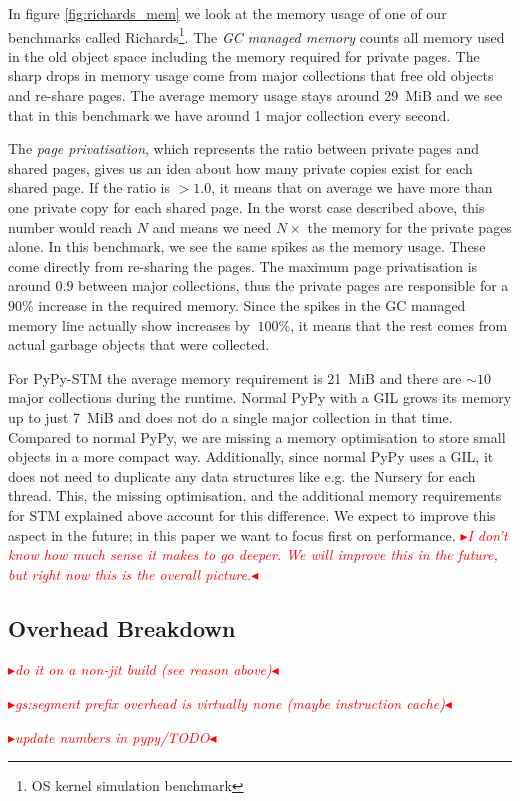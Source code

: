 \documentclass{sigplanconf}
\newcommand{\mynote}[2]{%
  \textcolor{red}{%
    \fbox{\bfseries\sffamily\scriptsize#1}%
    {\small$\blacktriangleright$\textsf{\emph{#2}}$\blacktriangleleft$}%
  }%
}
\newcommand\remi[1]{\mynote{Remi}{#1}}
\begin{document}
In figure \ref{fig:richards_mem} we look at the memory usage of one of
our benchmarks called Richards\footnote{OS kernel simulation
benchmark}. The \emph{GC managed memory} counts all memory used in the
old object space including the memory required for private pages. The
sharp drops in memory usage come from major collections that free old
objects and re-share pages. The average memory usage stays around
29~MiB and we see that in this benchmark we have around 1 major
collection every second.

The \emph{page privatisation}, which represents the ratio between
private pages and shared pages, gives us an idea about how many
private copies exist for each shared page. If the ratio is $>1.0$, it
means that on average we have more than one private copy for each
shared page. In the worst case described above, this number would
reach $N$ and means we need $N\times$ the memory for the private
pages alone. In this benchmark, we see the same spikes as the memory
usage. These come directly from re-sharing the pages. The maximum page
privatisation is around $0.9$ between major collections, thus the
private pages are responsible for a $90\%$ increase in the required
memory. Since the spikes in the GC managed memory line actually
show increases by $~100\%$, it means that the rest comes from actual
garbage objects that were collected.

For PyPy-STM the average memory requirement is 21~MiB and there are
$\sim 10$ major collections during the runtime. Normal PyPy with a GIL
grows its memory up to just 7~MiB and does not do a single major
collection in that time. Compared to normal PyPy, we are missing a
memory optimisation to store small objects in a more compact
way. Additionally, since normal PyPy uses a GIL, it does not need to
duplicate any data structures like e.g. the Nursery for each
thread. This, the missing optimisation, and the additional memory
requirements for STM explained above account for this difference.
We expect to improve this aspect in the future; in this paper we
want to focus first on performance.
\remi{I don't know how much sense it makes to go deeper. We will
improve this in the future, but right now this is the overall picture.}



\subsection{Overhead Breakdown}

\remi{do it on a non-jit build (see reason above)}
\remi{gs:segment prefix overhead is virtually none (maybe instruction cache)}
\remi{update numbers in pypy/TODO}
\end{document}
